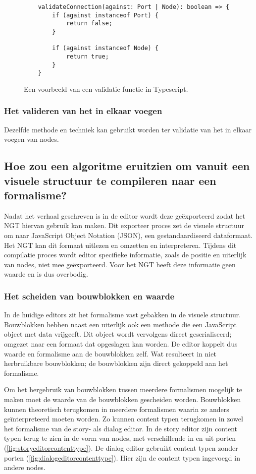 \begin{figure}[htb]
    \centering
    \lstset{language=JavaScript}
    \begin{lstlisting}
    validateConnection(against: Port | Node): boolean => {
        if (against instanceof Port) {
            return false;
        }

        if (against instanceof Node) {
            return true;
        }
    }
    \end{lstlisting}
    \caption{Een voorbeeld van een validatie functie in Typescript.}
    \label{fig:validationfunction}
\end{figure}

\subsubsection{Het valideren van het in elkaar voegen}
Dezelfde methode en techniek kan gebruikt worden ter validatie van het in elkaar voegen van nodes.

\subsection{Hoe zou een algoritme eruitzien om vanuit een visuele structuur te compileren naar een formalisme?}
Nadat het verhaal geschreven is in de editor wordt deze geëxporteerd zodat het NGT hiervan gebruik kan maken. Dit exporteer proces zet de visuele structuur om naar JavaScript Object Notation (JSON), een gestandaardiseerd dataformaat. Het NGT kan dit formaat uitlezen en omzetten en interpreteren. Tijdens dit compilatie proces wordt editor specifieke informatie, zoals de positie en uiterlijk van nodes, niet mee geëxporteerd. Voor het NGT heeft deze informatie geen waarde en is dus overbodig.

\subsubsection{Het scheiden van bouwblokken en waarde}
In de huidige editors zit het formalisme vast gebakken in de visuele structuur. Bouwblokken hebben naast een uiterlijk ook een methode die een JavaScript object met data vrijgeeft. Dit object wordt vervolgens direct geserialiseerd; omgezet naar een formaat dat opgeslagen kan worden. De editor koppelt dus waarde en formalisme aan de bouwblokken zelf. Wat resulteert in niet herbruikbare bouwblokken; de bouwblokken zijn direct gekoppeld aan het formalisme.

Om het hergebruik van bouwblokken tussen meerdere formalismen mogelijk te maken moet de waarde van de bouwblokken gescheiden worden. Bouwblokken kunnen theoretisch terugkomen in meerdere formalismen waarin ze anders geïnterpreteerd moeten worden. Zo kunnen content typen terugkomen in zowel het formalisme van de story- als dialog editor. In de story editor zijn content typen terug te zien in de vorm van nodes, met verschillende in en uit porten (\autoref{fig:storyeditorcontenttype}). De dialog editor gebruikt content typen zonder porten (\autoref{fig:dialogeditorcontenttype}). Hier zijn de content typen ingevoegd in andere nodes.

